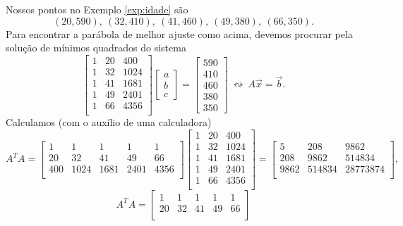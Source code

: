 \documentclass[../livro.tex]{subfiles}  %
\begin{document}
\begin{example}
  Nossos pontos no Exemplo \ref{exp:idade} são
  \[
  (20, 590), \ (32, 410), \ (41, 460), \ (49, 380), \ (66, 350).
  \] Para encontrar a parábola de melhor ajuste como acima, devemos procurar pela solução de mínimos quadrados do sistema
  \[
  \begin{bmatrix}
    1 & 20 & 400 \\
    1 & 32 & 1024 \\
    1 & 41 & 1681 \\
    1 & 49 & 2401 \\
    1 & 66 & 4356 \\
  \end{bmatrix}
  \begin{bmatrix}
    a \\ b \\ c
  \end{bmatrix} =
  \begin{bmatrix}
    590 \\ 410 \\ 460 \\ 380 \\ 350
  \end{bmatrix} \ \leftrightsquigarrow \ A \vec{x} = \vec{b}.
  \] Calculamos (com o auxílio de uma calculadora)
  \[
  A^T A =
  \begin{bmatrix}
    1 & 1 & 1 & 1 & 1 \\
    20 & 32 & 41 & 49 & 66 \\
    400 & 1024 & 1681 & 2401 & 4356 \\
  \end{bmatrix}
  \begin{bmatrix}
    1 & 20 & 400 \\
    1 & 32 & 1024 \\
    1 & 41 & 1681 \\
    1 & 49 & 2401 \\
    1 & 66 & 4356 \\
  \end{bmatrix} =
  \begin{bmatrix}
    5 & 208 & 9862 \\
    208 & 9862 & 514834 \\
    9862 & 514834 & 28773874 \\
  \end{bmatrix},
  \]
  \[
  A^T A =
  \begin{bmatrix}
    1 & 1 & 1 & 1 & 1 \\
    20 & 32 & 41 & 49 & 66 \\

\end{bmatrix}\]
\end{example}
\end{document}
